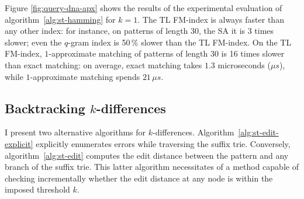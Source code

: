 %

Figure \ref{fig:query-dna-apx} shows the results of the experimental evaluation of algorithm~\ref{alg:st-hamming} for $k=1$.
The TL FM-index is always faster than any other index: for instance, on patterns of length 30, the SA it is 3 times slower; even the $q$-gram index is 50\,\% slower than the TL FM-index.
On the TL FM-index, $1$-approximate matching of patterns of length 30 is 16 times slower than exact matching: on average, exact matching takes $1.3$ microseconds ($\mu s$), while $1$-approximate matching spends $21 \, \mu s$.

\subsection{Backtracking $k$-differences}
\label{sec:index:algo:kdifferences}

I present two alternative algorithms for $k$-differences.
Algorithm~\ref{alg:st-edit-explicit} explicitly enumerates errors while traversing the suffix trie. Conversely, algorithm~\ref{alg:st-edit} computes the edit distance between the pattern and any branch of the suffix trie.
This latter algorithm necessitates of a method capable of checking incrementally whether the edit distance at any node is within the imposed threshold $k$.


